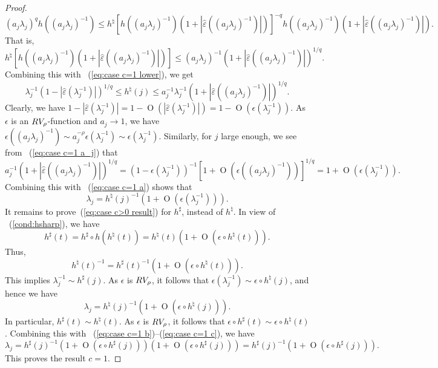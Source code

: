 \documentclass[10pt,a4paper]{amsart}
\newcommand{\RV}{\textup{RV}}
\newcommand{\op}{\operatorname}
\begin{document}
\begin{proof}
\begin{equation*}
(a_j\lambda_j)^qh((a_j\lambda_j)^{-1})\leq h^\natural[  h((a_j\lambda_j)^{-1})(1+|\hat{\varepsilon}((a_j\lambda_j)^{-1})|)]^{-q}h((a_j\lambda_j)^{-1})(1+|\hat{\varepsilon}((a_j\lambda_j)^{-1})|).
\end{equation*}
That is,
\begin{equation*}
h^\natural[  h((a_j\lambda_j)^{-1})(1+|\hat{\varepsilon}((a_j\lambda_j)^{-1})|)]\leq (a_j\lambda_j)^{-1}(1+|\hat{\varepsilon}((a_j\lambda_j)^{-1})|)^{1/q}.
\end{equation*}
Combining this with ~(\ref{eq:case c=1 lower}), we get
\begin{equation}\label{eq:case c=1 a}
\lambda_j^{-1}(1-|\hat{\varepsilon}(\lambda_j^{-1})|)^{1/q}\leq h^\natural(j)\leq a_j^{-1}\lambda_j^{-1}(1+|\hat{\varepsilon}((a_j\lambda_j)^{-1})|)^{1/q}.
\end{equation}
Clearly, we have $1-|\hat{\varepsilon}(\lambda_j^{-1})|=1-\op{O}(|\hat{\varepsilon}(\lambda_j^{-1})|)=1-\op{O}(\epsilon(\lambda_j^{-1}))$. As  $\epsilon$ is an $\RV_{\rho}$-function and $a_j\to1$, we have $ \epsilon((a_j\lambda_j)^{-1})\sim a_j^{-\rho}\epsilon(\lambda_j^{-1})\sim \epsilon(\lambda_j^{-1})$. Similarly, for $j$ large enough, we see from ~(\ref{eq:case c=1 a_j}) that
\begin{equation*}
a_j^{-1}(1+|\hat{\varepsilon}((a_j\lambda_j)^{-1})|)^{1/q}=(1-\epsilon(\lambda_j^{-1}))^{-1}[1+\op{O}(\epsilon((a_j\lambda_j)^{-1}))]^{1/q}=1+\op{O}(\epsilon(\lambda_j^{-1})).
\end{equation*}
Combining this with ~(\ref{eq:case c=1 a}) shows that
\begin{equation}\label{eq:case c=1 b}
\lambda_j=h^\natural(j)^{-1}(1+\op{O}(\epsilon(\lambda_j^{-1}))).
\end{equation}
It remains to prove~(\ref{eq:case c>0 result}) for $h^\sharp$, instead of $h^\natural$. In view of ~(\ref{cond:hsharp}), we have
\begin{equation*}
h^\sharp(t)=h^\sharp\circ h(h^\natural(t))=h^\natural(t)(1+\op{O}(\epsilon\circ h^\natural(t))).
\end{equation*}
Thus,
\begin{equation}\label{eq:case c=1 c}
h^{\natural}(t)^{-1}=h^\sharp(t)^{-1}(1+\op{O}(\epsilon\circ h^\natural(t))).
\end{equation}
This implies
$\lambda_j^{-1}\sim h^\sharp(j)$.
As $\epsilon$ is $\RV_\rho$, it follows that $\epsilon(\lambda_j^{-1})\sim \epsilon\circ h^\natural(j)$, and hence we have
\begin{equation*}
\lambda_j=h^\natural(j)^{-1}(1+\op{O}(\epsilon\circ h^\natural(j))).
\end{equation*}
In particular, $h^\sharp(t)\sim h^\natural(t)$. As $\epsilon$ is $\RV_\rho$, it follows that $\epsilon\circ h^\sharp(t)\sim \epsilon\circ h^\natural(t)$. Combining this with ~(\ref{eq:case c=1 b})--(\ref{eq:case c=1 c}), we have
\begin{equation*}
\lambda_j=h^\sharp(j)^{-1}(1+\op{O}(\epsilon\circ h^\sharp(j)))(1+\op{O}(\epsilon\circ h^\sharp(j)))=h^\sharp(j)^{-1}(1+\op{O}(\epsilon\circ h^\sharp(j))).
\end{equation*}
This proves the result $c=1$. 


\end{proof}
\end{document}
